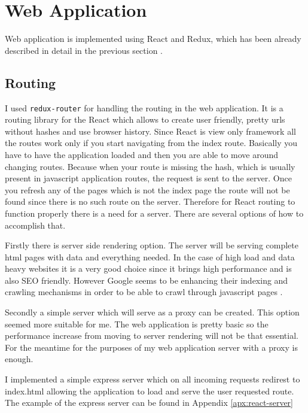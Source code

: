 \documentclass[thesis=M,english]{FITthesis}[2012/10/20]
\begin{document}
\section{Web Application}

Web application is implemented using React and Redux, which has been already described in detail in the previous section .

\subsection{Routing}

I used \verb|redux-router| \cite{react-router} for handling the routing in the web application. It is a routing library for the React which allows to create user friendly, pretty urls without hashes and use browser history. Since React is view only framework all the routes work only if you start navigating from the index route. Basically you have to have the application loaded and then you are able to move around changing routes. Because when your route is missing the hash, which is usually present in javascript application routes, the request is sent to the server. Once you refresh any of the pages which is not the index page the route will not be found since there is no such route on the server. Therefore for React routing to function properly there is a need for a server. There are several options of how to accomplish that. 

Firstly there is server side rendering option. The server will be serving complete html pages with data and everything needed. In the case of high load and data heavy websites it is a very good choice since it brings high performance and is also SEO friendly. However Google seems to be enhancing their indexing and crawling mechanisms in order to be able to crawl through javascript pages \cite{google-blog}. 

Secondly a simple server which will serve as a proxy can be created. This option seemed more suitable for me. The web application is pretty basic so the performance increase from moving to server rendering will not be that essential. For the meantime for the purposes of my web application server with a proxy is enough.

I implemented a simple express server which on all incoming requests redirest to index.html allowing the application to load and serve the user requested route. The example of the express server can be found in Appendix \ref{apx:react-server}
\end{document}
